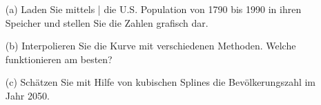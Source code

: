 \begin{aufg}[0]
\begin{itemize}
\item [(a)] Laden Sie mittels |  die
  U.S. Population  von  1790 bis 1990 in ihren Speicher und stellen Sie die Zahlen grafisch
  dar.
\item[(b)] Interpolieren Sie die Kurve mit verschiedenen Methoden.  Welche funktionieren am besten?
\item [(c)] Schätzen Sie mit Hilfe von kubischen Splines die  Bevölkerungszahl im Jahr 2050. 
\end{itemize}
\end{aufg}
